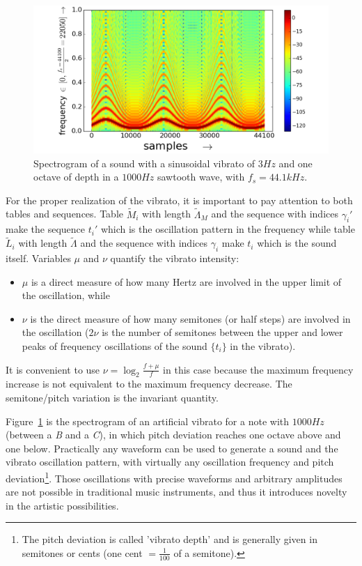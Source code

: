 \begin{figure}[h!]
     \centering
         \includegraphics[width=\columnwidth]{figures/vibrato_}
     \caption{Spectrogram of a sound with a sinusoidal vibrato of $3Hz$ and one octave of depth in a $1000Hz$ sawtooth wave, with $f_s=44.1kHz$.}
         \label{fig:vibrato}
\end{figure}

For the proper realization of the vibrato, it is important to pay attention to both tables and sequences. Table $\widetilde{M}_i$ with length $\widetilde{\Lambda}_M$ and the sequence with indices $\gamma_i'$ make the sequence $t_i'$ which is the oscillation pattern in the frequency while table $\widetilde{L}_i$ with length $\widetilde{\Lambda}$ and the sequence with indices $\gamma_i$ make $t_i$ which is the sound itself. Variables $\mu$ and $\nu$ quantify the vibrato intensity:
\begin{itemize}
    \item $\mu$ is a direct measure of how many Hertz are involved in the upper limit of the oscillation, while
    \item $\nu$ is the direct measure of how many semitones (or half steps) are involved in the oscillation ($2\nu$ is the number of semitones between the upper and lower peaks of frequency oscillations of the sound $\{t_i\}$ in the vibrato).
\end{itemize}

It is convenient to use $\nu=\log_{2}\frac{f+\mu}{f} $ in this case because the maximum frequency increase is not equivalent to the maximum frequency decrease. The semitone/pitch variation is the invariant quantity.

Figure~\ref{fig:vibrato} is the spectrogram of an artificial vibrato for a note with $1000Hz$ (between a \emph{B} and a \emph{C}), in which pitch deviation reaches one octave above and one below. Practically any waveform can be used to generate a sound and the vibrato oscillation pattern, with virtually any oscillation frequency and pitch deviation\footnote{The pitch deviation is called 'vibrato depth' and is generally given in semitones or cents (one cent $= \frac{1}{100}$ of a semitone).}.
Those oscillations with precise waveforms and arbitrary amplitudes are not possible in traditional music instruments, and thus it introduces novelty in the artistic possibilities.

